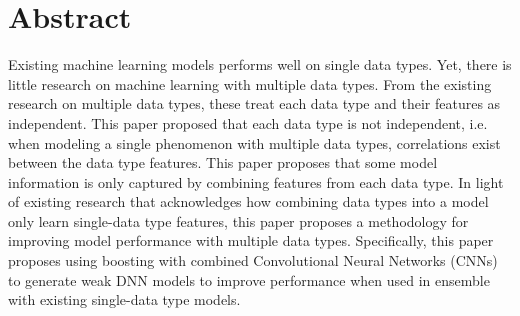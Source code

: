 
\section{Abstract}

Existing machine learning models performs well on single data types.  Yet, there is little research on machine learning with multiple data types.  From the existing research on multiple data types, these treat each data type and their features as independent.  This paper proposed that each data type is not independent, i.e. when modeling a single phenomenon with multiple data types, correlations exist between the data type features. This paper proposes that some model information is only captured by combining features from each data type.  In light of existing research that acknowledges how combining data types into a model only learn single-data type features, this paper proposes a methodology for improving model performance with multiple data types.  Specifically, this paper proposes using boosting with combined Convolutional Neural Networks (CNNs) to generate weak DNN models to improve performance when used in ensemble with existing single-data type models.












